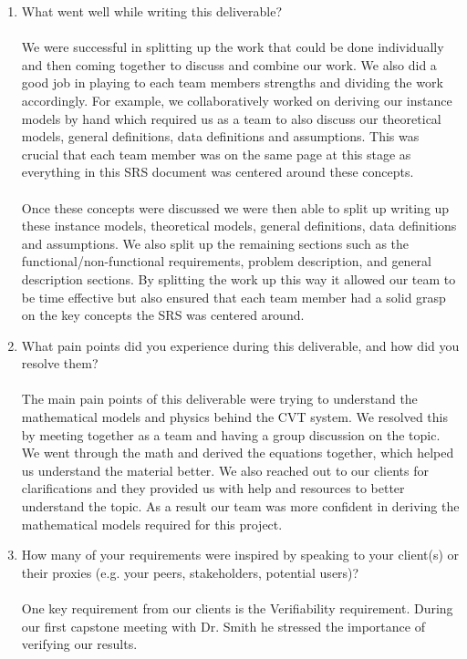 \documentclass[12pt]{article}
\begin{document}
\begin{enumerate}
  \item What went well while writing this deliverable?
  \\\\
  We were successful in splitting up the work that could be done individually and then coming together to discuss and combine our work.
  We also did a good job in playing to each team members strengths and dividing the work accordingly. 
  For example, we collaboratively worked on deriving our instance models by hand which required us as a team to also discuss our theoretical models, general definitions, data definitions and assumptions. 
  This was crucial that each team member was on the same page at this stage as everything in this SRS document was centered around these concepts.
  \\\\
  Once these concepts were discussed we were then able to split up writing up these instance models, theoretical models, general definitions, data definitions and assumptions. 
  We also split up the remaining sections such as the functional/non-functional requirements, problem description, and general description sections. 
  By splitting the work up this way it allowed our team to be time effective but also ensured that each team member had a solid grasp on the key concepts the SRS was centered around.  
  \item What pain points did you experience during this deliverable, and how did
  you resolve them?
  \\\\
  The main pain points of this deliverable were trying to understand the mathematical models and physics behind the CVT system.
  We resolved this by meeting together as a team and having a group discussion on the topic.
  We went through the math and derived the equations together, which helped us understand the material better.
  We also reached out to our clients for clarifications and they provided us with help and resources to better understand the topic. 
  As a result our team was more confident in deriving the mathematical models required for this project.   
  \item How many of your requirements were inspired by speaking to your
  client(s) or their proxies (e.g. your peers, stakeholders, potential users)?
  \\\\
  One key requirement from our clients is the Verifiability requirement.
  During our first capstone meeting with Dr. Smith he stressed the importance of verifying our results.

\end{enumerate}
\end{document}
